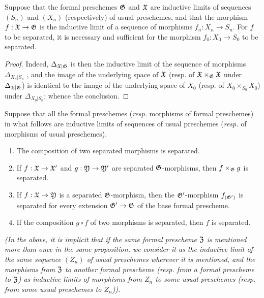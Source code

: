 \begin{prop}[10.15.2]
\label{1.10.15.2}
Suppose that the formal preschemes $\mathfrak{G}$ and $\mathfrak{X}$ are inductive limits of sequences $(S_n)$ and $(X_n)$ (respectively) of usual preschemes, and that the morphism $f:\fk{X}\to\fk{G}$ is the inductive limit of a sequence of morphisms $f_n:X_n\to S_n$.
For $f$ to be separated, it is necessary and sufficient for the morphism $f_0:X_0\to S_0$ to be separated.
\end{prop}

\begin{proof}
\label{proof-1.10.15.2}
Indeed, $\Delta_{\mathfrak{X}|\mathfrak{G}}$ is then the inductive limit of the sequence of morphisms $\Delta_{X_n|S_n}$ , and the image of the underlying space of $\mathfrak{X}$ (resp. of $\mathfrak{X}\times_\mathfrak{G}\mathfrak{X}$ under $\Delta_{\mathfrak{X}|\mathfrak{G}}$) is identical to the image of the underlying space of $X_0$ (resp. of $X_0\times_{S_0}X_0$) under $\Delta_{X_0|S_0}$;
whence the conclusion.
\end{proof}

\begin{prop}[10.15.3]
\label{1.10.15.3}
Suppose that all the formal preschemes (\emph{resp.} morphisms of formal preschemes) in what follows are inductive limits of sequences of usual preschemes (\emph{resp.} of morphisms of usual preschemes).
\begin{enumerate}[label=\emph{(\roman*)}]
    \item The composition of two separated morphisms is separated.
    \item If $f:\fk{X}\to\fk{X}'$ and $g:\fk{Y}\to\fk{Y}'$ are separated $\mathfrak{G}$-morphisms, then $f\times_\mathfrak{G}g$ is separated.
    \item If $f:\fk{X}\to\fk{Y}$ is a separated $\mathfrak{G}$-morphism, then the $\mathfrak{G}'$-morphism $f_{(\mathfrak{G}')}$ is separated for every extension $\fk{G}'\to\fk{G}$ of the base formal prescheme.
    \item If the composition $g\circ f$ of two morphisms is separated, then $f$ is separated.
\end{enumerate}
\emph{(In the above, it is implicit that if the same formal prescheme $\mathfrak{Z}$ is mentioned more than once in the same proposition, we consider it as the inductive limit of the \emph{same} sequence $(Z_n)$ of usual preschemes wherever it is mentioned, and the morphisms from $\mathfrak{Z}$ to another formal prescheme (resp. from a formal prescheme to $\mathfrak{Z}$) as inductive limits of morphisms from $Z_n$ to some usual preschemes (resp. from some usual preschemes to $Z_n$)).}
\end{prop}

